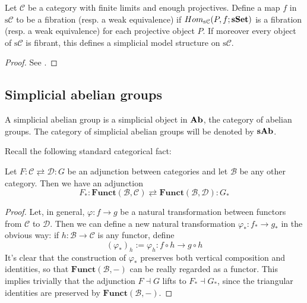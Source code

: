 \begin{refsection}
\begin{thm} \label{thm quillen 4}
Let $\mathcal C$ be a category with finite limits and enough projectives. Define a map $f$ in $\mathrm s \mathcal C$ to be a fibration (resp. a weak equivalence) if $Hom_{\mathrm s \mathcal C}(P,f;\mathbf{sSet})$ is a fibration (resp. a weak equivalence) for each projective object $P$. If moreover every object of $\mathrm s \mathcal C$ is fibrant, this defines a simplicial model structure on $\mathrm s \mathcal C$.
\end{thm}

\begin{proof}
See \cite[Thm. II.4.4]{quillen}.
\end{proof}

\subsection{Simplicial abelian groups}

\begin{defin}
A simplicial abelian group is a simplicial object in $\mathbf{Ab}$, the category of abelian groups. The category of simplicial abelian groups will be denoted by $\mathbf s \mathbf{Ab}$.
\end{defin}

Recall the following standard categorical fact:

\begin{lemma} \label{lemma functor adjunction}
Let $F \colon \mathcal C \rightleftarrows \mathcal D \colon G$ be an adjunction between categories and let $\mathcal B$ be any other category. Then we have an adjunction
\[
F_* \colon \mathbf{Funct}(\mathcal B, \mathcal C) \rightleftarrows \mathbf{Funct}(\mathcal B, \mathcal D) \colon G_*
\]
\end{lemma}

\begin{proof}
Let, in general, $\varphi \colon f \to g$ be a natural transformation between functors from $\mathcal C$ to $\mathcal D$. Then we can define a new natural transformation $\varphi_* \colon f_* \to g_*$ in the obvious way: if $h \colon \mathcal B \to \mathcal C$ is any functor, define
\[
(\varphi_*)_h := \varphi_h \colon f \circ h \to g \circ h
\]
It's clear that the construction of $\varphi_*$ preserves both vertical composition and identities, so that $\mathbf{Funct}(\mathcal B,-)$ can be really regarded as a functor. This implies trivially that the adjunction $F \dashv G$ lifts to $F_* \dashv G_*$, since the triangular identities are preserved by $\mathbf{Funct}(\mathcal B,-)$.
\end{proof}


\end{refsection}
